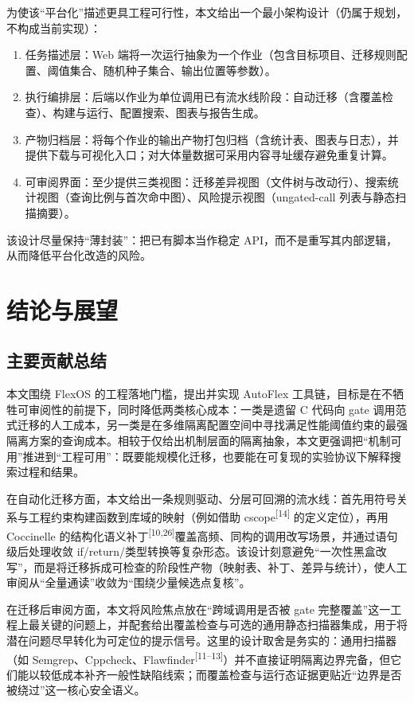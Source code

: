 \documentclass[UTF8,a4paper,12pt]{ctexart}
\numberwithin{equation}{section}
\begin{document}
为使该``平台化''描述更具工程可行性，本文给出一个最小架构设计（仍属于规划，不构成当前实现）：
\begin{enumerate}
\def\labelenumi{\arabic{enumi}.}
\item
  任务描述层：Web
  端将一次运行抽象为一个作业（包含目标项目、迁移规则配置、阈值集合、随机种子集合、输出位置等参数）。
\item
  执行编排层：后端以作业为单位调用已有流水线阶段：自动迁移（含覆盖检查）、构建与运行、配置搜索、图表与报告生成。
\item
  产物归档层：将每个作业的输出产物打包归档（含统计表、图表与日志），并提供下载与可视化入口；对大体量数据可采用内容寻址缓存避免重复计算。
\item
  可审阅界面：至少提供三类视图：迁移差异视图（文件树与改动行）、搜索统计视图（查询比例与首次命中图）、风险提示视图（ungated-call
  列表与静态扫描摘要）。
\end{enumerate}

该设计尽量保持``薄封装''：把已有脚本当作稳定
API，而不是重写其内部逻辑，从而降低平台化改造的风险。


\section{结论与展望}

\subsection{主要贡献总结}

本文围绕 FlexOS 的工程落地门槛，提出并实现 AutoFlex 工具链，目标是在不牺牲可审阅性的前提下，同时降低两类核心成本：一类是遗留 C 代码向 gate 调用范式迁移的人工成本，另一类是在多维隔离配置空间中寻找满足性能阈值约束的最强隔离方案的查询成本。相较于仅给出机制层面的隔离抽象，本文更强调把``机制可用''推进到``工程可用''：既要能规模化迁移，也要能在可复现的实验协议下解释搜索过程和结果。

在自动化迁移方面，本文给出一条规则驱动、分层可回溯的流水线：首先用符号关系与工程约束构建函数到库域的映射（例如借助 cscope\textsuperscript{[14]} 的定义定位），再用 Coccinelle 的结构化语义补丁\textsuperscript{[10,26]}覆盖高频、同构的调用改写场景，并通过语句级后处理收敛 if/return/类型转换等复杂形态。该设计刻意避免``一次性黑盒改写''，而是将迁移拆成可检查的阶段性产物（映射表、补丁、差异与统计），使人工审阅从``全量通读''收敛为``围绕少量候选点复核''。

在迁移后审阅方面，本文将风险焦点放在``跨域调用是否被 gate 完整覆盖''这一工程上最关键的问题上，并配套给出覆盖检查与可选的通用静态扫描器集成，用于将潜在问题尽早转化为可定位的提示信号。这里的设计取舍是务实的：通用扫描器（如 Semgrep、Cppcheck、Flawfinder\textsuperscript{[11--13]}）并不直接证明隔离边界完备，但它们能以较低成本补齐一般性缺陷线索；而覆盖检查与运行态证据更贴近``边界是否被绕过''这一核心安全语义。
\end{document}
